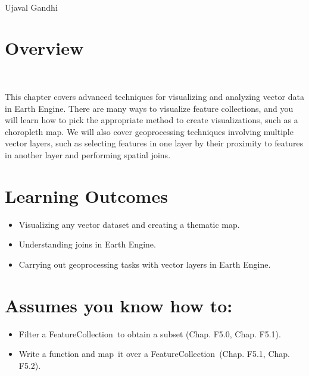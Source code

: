 \documentclass[
  letterpaper,
  DIV=11,
  numbers=noendperiod]{scrreprt}
\providecommand{\tightlist}{%
  \setlength{\itemsep}{0pt}\setlength{\parskip}{0pt}}\usepackage{longtable,booktabs,array}
\begin{document}
~

Ujaval Gandhi

\hypertarget{overview-19}{%
\section*{Overview}\label{overview-19}}


~

This chapter covers advanced techniques for visualizing and analyzing
vector data in Earth Engine. There are many ways to visualize feature
collections, and you will learn how to pick the appropriate method to
create visualizations, such as a choropleth map. We will also cover
geoprocessing techniques involving multiple vector layers, such as
selecting features in one layer by their proximity to features in
another layer and performing spatial joins.

\hypertarget{learning-outcomes-19}{%
\section*{Learning Outcomes}\label{learning-outcomes-19}}


\begin{itemize}
\tightlist
\item
  Visualizing any vector dataset and creating a thematic map.
\item
  Understanding joins in Earth Engine.
\item
  Carrying out geoprocessing tasks with vector layers in Earth Engine.
\end{itemize}

\hypertarget{assumes-you-know-how-to-19}{%
\section*{Assumes you know how to:}\label{assumes-you-know-how-to-19}}


\begin{itemize}
\tightlist
\item
  Filter a FeatureCollection~to obtain a subset (Chap. F5.0, Chap.
  F5.1).
\item
  Write a function and map~it over a FeatureCollection~(Chap. F5.1,
  Chap. F5.2).
\end{itemize}
\end{document}
